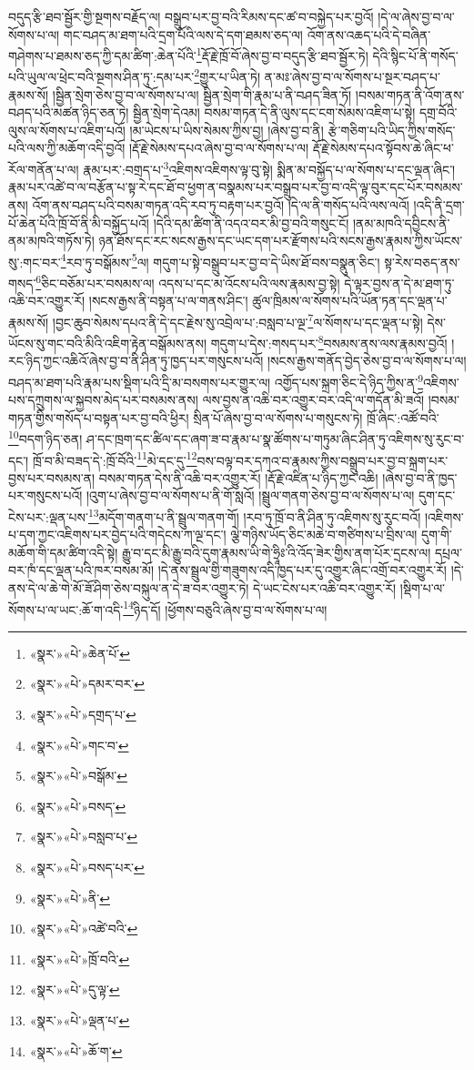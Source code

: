 བདུད་རྩི་ཐབ་སྦྱོར་གྱི་སྔགས་བརྗོད་ལ། བསྒྲུབ་པར་བྱ་བའི་རིམས་དང་ཚ་བ་བསྐྱེད་པར་བྱའོ། །དེ་ལ་ཞེས་བྱ་བ་ལ་སོགས་པ་ལ། གང་བཤད་མ་ཐག་པའི་དྲག་པོའི་ལས་དེ་དག་ཐམས་ཅད་ལ། འོག་ནས་འཆད་པའི་དེ་བཞིན་གཤེགས་པ་ཐམས་ཅད་ཀྱི་དམ་ཚིག་:ཆེན་པོའི་\footnote{«སྣར་»«པེ་»ཆེན་པོ་}རྡོ་རྗེ་ཁྲོ་བོ་ཞེས་བྱ་བ་བདུད་རྩི་ཐབ་སྦྱོར་ཏེ། དེའི་སྙིང་པོ་ནི་གསོད་པའི་ཡུལ་ལ་ཕྲེང་བའི་སྔགས་ཤིན་ཏུ་:དམ་པར་\footnote{«སྣར་»«པེ་»དམར་བར་}གྱུར་པ་ཡིན་ཏེ། ན་མཿ་ཞེས་བྱ་བ་ལ་སོགས་པ་སྔར་བཤད་པ་རྣམས་སོ། །སྦྱིན་སྲེག་ཅེས་བྱ་བ་ལ་སོགས་པ་ལ། སྦྱིན་སྲེག་གི་རྣམ་པ་ནི་བཤད་ཟིན་ཏོ། །བསམ་གཏན་ནི་འོག་ནས་བཤད་པའི་མཚན་ཉིད་ཅན་ཏེ། སྦྱིན་སྲེག་དེའམ། བསམ་གཏན་དེ་ནི་ལུས་དང་ངག་སེམས་འཇིག་པ་སྟེ། དགྲ་བོའི་ལུས་ལ་སོགས་པ་འཇིག་པའོ། །མ་ཡེངས་པ་ཡིས་སེམས་ཀྱིས་བྱ། །ཞེས་བྱ་བ་ནི། རྩེ་གཅིག་པའི་ཡིད་ཀྱིས་གསོད་པའི་ལས་ཀྱི་མཆོག་འདི་བྱའོ། །རྡོ་རྗེ་སེམས་དཔའ་ཞེས་བྱ་བ་ལ་སོགས་པ་ལ། རྡོ་རྗེ་སེམས་དཔའ་སྟོབས་ཆེ་ཞིང་ཕ་རོལ་གནོན་པ་ལ། རྣམ་པར་:བགྲད་པ་\footnote{«སྣར་»«པེ་»དགྲད་པ་}འཇིགས་འཇིགས་ལྟ་བུ་སྟེ། སྨིན་མ་བསྐྱོད་པ་ལ་སོགས་པ་དང་ལྡན་ཞིང་། རྣམ་པར་འཚེ་བ་ལ་བརྩོན་པ་སྟ་རེ་དང་ཐོ་བ་ཕྱག་ན་བསྣམས་པར་བསྒྲུབ་པར་བྱ་བ་འདི་ལྟ་བུར་དང་པོར་བསམས་ནས། འོག་ནས་བཤད་པའི་བསམ་གཏན་འདི་རབ་ཏུ་བརྟག་པར་བྱའོ། །དེ་ལ་ནི་གསོད་པའི་ལས་ལའོ། །འདི་ནི་དྲག་པོ་ཆེན་པོའི་ཁྲོ་བོ་ནི་མི་བསྐྱོད་པའོ། །དེའི་དམ་ཚིག་ནི་འདའ་བར་མི་བྱ་བའི་གསུང་ངོ། །ནམ་མཁའི་དབྱིངས་ནི་ནམ་མཁའི་གཏོས་ཏེ། ཉན་ཐོས་དང་རང་སངས་རྒྱས་དང་ཡང་དག་པར་རྫོགས་པའི་སངས་རྒྱས་རྣམས་ཀྱིས་ཡོངས་སུ་:གང་བར་\footnote{«སྣར་»«པེ་»གང་བ་}རབ་ཏུ་བསྒོམས་\footnote{«སྣར་»«པེ་»བསྒོམ་}ལ། གདུག་པ་སྟེ་བསྒྲུབ་པར་བྱ་བ་དེ་ཡིས་ཐོ་བས་བསྣུན་ཅིང་། སྟ་རེས་བཅད་ནས་གསད་\footnote{«སྣར་»«པེ་»བསད་}ཅིང་བཅོམ་པར་བསམས་ལ། འདས་པ་དང་མ་འོངས་པའི་ལས་རྣམས་བྱ་སྟེ། དེ་ལྟར་བྱས་ན་དེ་མ་ཐག་ཏུ་འཆི་བར་འགྱུར་རོ། །སངས་རྒྱས་ནི་བསྟན་པ་ལ་གནས་ཤིང་། ཚུལ་ཁྲིམས་ལ་སོགས་པའི་ཡོན་ཏན་དང་ལྡན་པ་རྣམས་སོ། །བྱང་ཆུབ་སེམས་དཔའ་ནི་དེ་དང་རྗེས་སུ་འབྲེལ་པ་:བསླབ་པ་ལྔ་\footnote{«སྣར་»«པེ་»བསླབ་པ་}ལ་སོགས་པ་དང་ལྡན་པ་སྟེ། དེས་ཡོངས་སུ་གང་བའི་མིའི་འཇིག་རྟེན་བསྒོམས་ནས། གདུག་པ་དེས་:གསད་པར་\footnote{«སྣར་»«པེ་»བསད་པར་}བསམས་ནས་ལས་རྣམས་བྱའོ། །རང་ཉིད་ཀྱང་འཆིའོ་ཞེས་བྱ་བ་ནི་ཤིན་ཏུ་ཁྱད་པར་གསུངས་པའོ། །སངས་རྒྱས་གནོད་བྱེད་ཅེས་བྱ་བ་ལ་སོགས་པ་ལ། བཤད་མ་ཐག་པའི་རྣམ་པས་སྡིག་པའི་དྲི་མ་བསགས་པར་གྱུར་ལ། འགྱོད་པས་སྐྲག་ཅིང་དེ་ཉིད་ཀྱིས་ན་\footnote{«སྣར་»«པེ་»ནི་}འཇིགས་པས་དཀྲུགས་ལ་སྐྱབས་མེད་པར་བསམས་ནས། ལས་བྱས་ན་འཆི་བར་འགྱུར་བར་འདི་ལ་གདོན་མི་ཟའོ། །བསམ་གཏན་གྱིས་གསོད་པ་བསྟན་པར་བྱ་བའི་ཕྱིར། སྲིན་པོ་ཞེས་བྱ་བ་ལ་སོགས་པ་གསུངས་ཏེ། ཁྲོ་ཞིང་:འཚོ་བའི་\footnote{«སྣར་»«པེ་»འཚེ་བའི་}བདག་ཉིད་ཅན། ཤ་དང་ཁྲག་དང་ཚིལ་དང་ཞག་ཟ་བ་རྣམ་པ་སྣ་ཚོགས་པ་གཏུམ་ཞིང་ཤིན་ཏུ་འཇིགས་སུ་རུང་བ་དང་། ཁྲོ་བ་མི་བཟད་དེ་:ཁྲོ་བོའི་\footnote{«སྣར་»«པེ་»ཁྲོ་བའི་}མེ་དང་དུ་\footnote{«སྣར་»«པེ་»དུ་ལྟ་}བས་བལྟ་བར་དཀའ་བ་རྣམས་ཀྱིས་བསྒྲུབ་པར་བྱ་བ་སྐྲག་པར་བྱས་པར་བསམས་ན། བསམ་གཏན་དེས་ནི་འཆི་བར་འགྱུར་རོ། །རྡོ་རྗེ་འཛིན་པ་ཉིད་ཀྱང་འཆི། །ཞེས་བྱ་བ་ནི་ཁྱད་པར་གསུངས་པའོ། །འུག་པ་ཞེས་བྱ་བ་ལ་སོགས་པ་ནི་གོ་སླའོ། །སྦྲུལ་གནག་ཅེས་བྱ་བ་ལ་སོགས་པ་ལ། དུག་དང་ངེས་པར་:ལྡན་པས་\footnote{«སྣར་»«པེ་»ལྡན་པ་}མདོག་གནག་པ་ནི་སྦྲུལ་གནག་གོ། །རབ་ཏུ་ཁྲོ་བ་ནི་ཤིན་ཏུ་འཇིགས་སུ་རུང་བའོ། །འཇིགས་པ་དག་ཀྱང་འཇིགས་པར་བྱེད་པའི་གདེངས་ཀ་ལྔ་དང་། ལྕེ་གཉིས་ཡོད་ཅིང་མཆེ་བ་གཙིགས་པ་བྲིས་ལ། དུག་གི་མཆོག་གི་དམ་ཚིག་འདི་སྟེ། རྒྱུ་བ་དང་མི་རྒྱུ་བའི་དུག་རྣམས་ཡི་གེ་ཧྲཱིཿ་འི་འོད་ཟེར་གྱིས་ནག་པོར་དྲངས་ལ། དཔྲལ་བར་ཁཾ་དང་ལྡན་པའི་ཁར་བསམ་མོ། །དེ་ནས་སྦྲུལ་གྱི་གཟུགས་འདི་ཁྱད་པར་དུ་འགྱུར་ཞིང་འགྲོ་བར་འགྱུར་རོ། །དེ་ནས་དེ་ལ་ཆེ་གེ་མོ་ཟོ་ཤིག་ཅེས་བསྐུལ་ན་དེ་ཟ་བར་འགྱུར་ཏེ། དེ་ཡང་ངེས་པར་འཆི་བར་འགྱུར་རོ། །སྡིག་པ་ལ་སོགས་པ་ལ་ཡང་:ཆོ་ག་འདི་\footnote{«སྣར་»«པེ་»ཆོ་ག་}ཉིད་དོ། །ཕྱོགས་བཅུའི་ཞེས་བྱ་བ་ལ་སོགས་པ་ལ། 